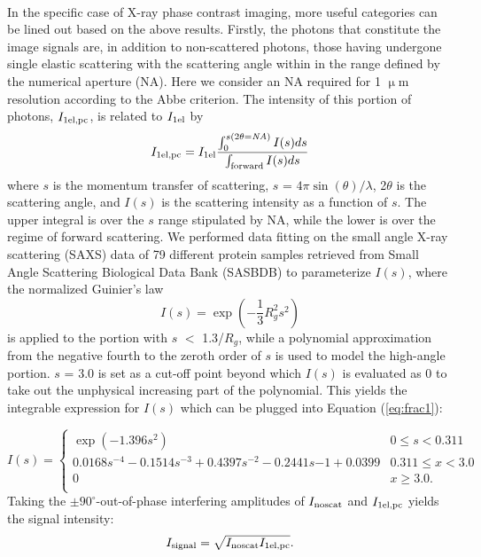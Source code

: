\documentclass[]{article}
\newcommand\noscat{\textup{\scriptsize{noscat}}}
\newcommand\sel{\textup{\scriptsize{1el}}}
\newcommand\signal{\textup{\scriptsize{signal}}}
\newcommand\selpc{\textup{\scriptsize{1el,pc}}}
\begin{document}
\paragraph{} In the specific case of X-ray phase contrast imaging, more useful categories can be lined out based on the above results. Firstly, the photons that constitute the image signals are, in addition to non-scattered photons, those having undergone single elastic scattering with the scattering angle within in the range defined by the numerical aperture (NA). Here we consider an NA required for 1 $\upmu$m resolution according to the Abbe criterion. The intensity of this portion of photons, $I_{\selpc}$, is related to $I_{\sel}$ by
\begin{equation}
I_{\selpc} = I_{\sel} \frac{\int_{0}^{s(2\theta=\it{NA})}I(s)ds}{\int_{\textup{forward}}I(s)ds}
\label{eq:frac1}
\end{equation}
where $s$ is the momentum transfer of scattering, $s$ = $4\pi\sin(\theta)/\lambda$, 2$\theta$ is the scattering angle, and $I(s)$ is the scattering intensity as a function of $s$. The upper integral is over the $s$ range stipulated by NA, while the lower is over the regime of forward scattering. We performed data fitting on the small angle X-ray scattering (SAXS) data of 79 different protein samples retrieved from Small Angle Scattering Biological Data Bank (SASBDB) \cite{Valentini28102014} to parameterize $I(s)$, where the normalized Guinier's law
\begin{equation}
I(s) = \exp(-\frac{1}{3}R_g^2s^2)
\end{equation}
is applied to the portion with $s$ $<$ 1.3/$R_g$, while a polynomial approximation from the negative fourth to the zeroth order of $s$ is used to model the high-angle portion. $s$ = 3.0 is set as a cut-off point beyond which $I(s)$ is evaluated as 0 to take out the unphysical increasing part of the polynomial. This yields the integrable expression for $I(s)$ which can be plugged into Equation (\ref{eq:frac1}):

\begin{equation}
I(s) = 
\begin{cases} 
      \exp(-1.396s^2) & 0 \leq s < 0.311 \\
      0.0168s^{-4} - 0.1514s^{-3} + 0.4397s^{-2} - 0.2441s{-1} + 0.0399 & 0.311 \leq x < 3.0 \\
      0 & x \geq 3.0. \\
   \end{cases}
\label{eq:fit}
\end{equation}
Taking the $\pm90^{\circ}$-out-of-phase interfering amplitudes of $I_{\noscat}$ and $I_{\selpc}$ yields the signal intensity:
\begin{equation}
I_{\signal} = \sqrt{I_{\noscat}I_{\selpc}}.
\end{equation}
\end{document}
